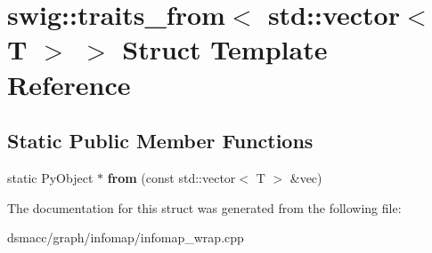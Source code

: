 \hypertarget{structswig_1_1traits__from_3_01std_1_1vector_3_01T_01_4_01_4}{}\section{swig\+:\+:traits\+\_\+from$<$ std\+:\+:vector$<$ T $>$ $>$ Struct Template Reference}
\label{structswig_1_1traits__from_3_01std_1_1vector_3_01T_01_4_01_4}
\subsection*{Static Public Member Functions}
\begin{DoxyCompactItemize}
\item 
\mbox{\label{structswig_1_1traits__from_3_01std_1_1vector_3_01T_01_4_01_4_a4c2827dea351d54dea6d21c7a227134b}} 
static Py\+Object $\ast$ {\bfseries from} (const std\+::vector$<$ T $>$ \&vec)
\end{DoxyCompactItemize}


The documentation for this struct was generated from the following file\+:\begin{DoxyCompactItemize}
\item 
dsmacc/graph/infomap/infomap\+\_\+wrap.\+cpp\end{DoxyCompactItemize}
